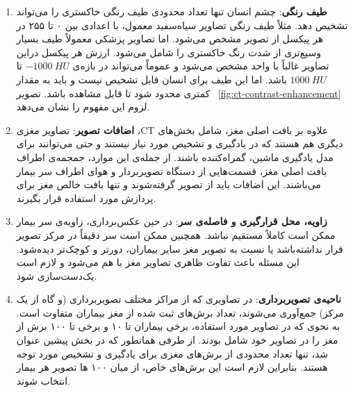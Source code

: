 \begin{enumerate}
        \item \textbf{طیف رنگی}:  چشم انسان تنها تعداد محدودی طیف رنگی خاکستری را می‌تواند تشخیص دهد. مثلاً طیف رنگی تصاویر سیاه‌سفید معمول، با اعدادی بین ۰ تا ۲۵۵ در هر پیکسل از تصویر مشخص می‌شود.
        اما تصاویر پزشکی معمولاً طیف بسیار وسیع‌تری از شدت رنگ خاکستری را شامل می‌شود. 
        ارزش هر پیکسل دراین تصاویر غالباً با واحد  مشخص می‌شود و عموماً می‌تواند در بازه‌ی $-1000\ HU$ تا $1000\ HU$ باشد.
        اما این طیف برای انسان قابل تشخیص نیست و باید به مقدار کمتری محدود شود تا قابل مشاهده باشد. 
         تصویر ~\ref{fig:ct-contrast-enhancement} لزوم این مفهوم را نشان می‌دهد.
        \item \textbf{اضافات تصویر}: تصاویر مغزی ،CT علاوه بر بافت اصلی مغز، شامل بخش‌های دیگری هم هستند که در یادگیری و تشخیص مورد نیاز نیستند و حتی می‌توانند برای مدل یادگیری ماشین، گمراه‌کننده باشند.
        از جمله‌ی این موارد، جمجمه‌ی اطراف بافت اصلی مغز، قسمت‌هایی از دستگاه تصویربردار و هوای اطراف سر بیمار می‌باشند.
        این اضافات باید از تصویر گرفته‌شوند و تنها بافت خالص مغز برای پردازش مورد استفاده قرار بگیرند.
        \item \textbf{زاویه، محل قرار‌گیری و فاصله‌ی سر}: در حین عکس‌برداری، زاویه‌ی سر بیمار ممکن است کاملاً مستقیم نباشد.
        همچنین ممکن است سر دقیقاً در مرکز تصویر قرار نداشته‌باشد یا نسبت به تصویر مغز سایر بیماران، دورتر و کوچک‌تر دیده‌شود.
        این مسئله باعث تفاوت ظاهری تصاویر مغز با هم می‌شود و لازم است یک‌دست‌سازی شود.
        \item \textbf{ناحیه‌ی تصویربرداری}: در تصاویری که از مراکز مختلف تصویربرداری (و گاه از یک مرکز) جمع‌آوری می‌شوند، 
        تعداد برش‌های ثبت شده از مغز بیماران متفاوت است.
        به نحوی که در تصاویر مورد استفاده، برخی بیماران تا ۱۰ و برخی تا ۱۰۰ برش از مغز را در تصاویر خود شامل بودند.
        از طرفی همانطور که در بخش پیشین عنوان شد، تنها تعداد محدودی از برش‌های مغزی برای یادگیری و تشخیص مورد توجه هستند.
        بنابراین لازم است این برش‌های خاص، از میان ۱۰۰ ها تصویر هر بیمار انتخاب شوند. 
\end{enumerate}


